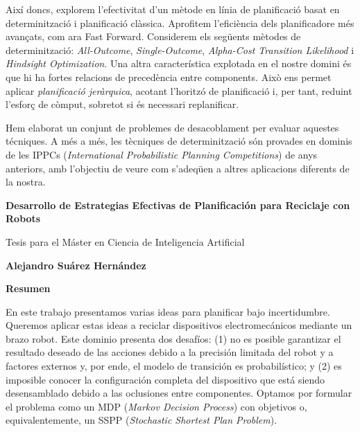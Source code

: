 Així doncs, explorem l'efectivitat d'un mètode en línia de planificació
basat en determinització i planificació clàssica. Aprofitem l'eficiència
dels planificadore més avançats, com ara Fast Forward. Considerem els
següents mètodes de determinització: \emph{All-Outcome}, \emph{Single-Outcome},
\emph{Alpha-Cost Transition Likelihood} i \emph{Hindsight Optimization}.
Una altra característica explotada en el nostre domini és que hi ha fortes
relacions de precedència entre
components. Això ens permet aplicar \emph{planificació jeràrquica}, acotant
l'horitzó de planificació i, per tant, reduint l'esforç de còmput,
sobretot si és necessari replanificar.

Hem elaborat un conjunt de problemes de desacoblament per evaluar aquestes
técniques. A més a més, les tècniques de determinització són provades en
dominis de les IPPCs (\emph{International Probabilistic Planning Competitions}) de
anys anteriors, amb l'objectiu de veure com s'adeqüen a altres aplicacions
diferents de la nostra.

\cleardoublepage

\thispagestyle{plain}
\begin{center}
	\Large
	\textbf{Desarrollo de Estrategias Efectivas de Planificación para Reciclaje con Robots}
	
	\vspace{0.4cm}
	\large
	Tesis para el Máster en Ciencia de Inteligencia Artificial
	
	\vspace{0.4cm}
	\textbf{Alejandro Suárez Hernández}
	
	\vspace{0.9cm}
	\textbf{Resumen}
\end{center}

En este trabajo presentamos varias ideas para planificar bajo
incertidumbre. Queremos aplicar estas ideas a reciclar
dispositivos electromecánicos mediante un brazo robot. Este dominio
presenta dos desafíos: (1) no es posible garantizar el resultado deseado
de las acciones debido a la precisión limitada del robot y a factores
externos y, por ende, el modelo de transición es probabilístico; y (2)
es imposible conocer la configuración completa del dispositivo que
está siendo
desensamblado debido a las oclusiones entre componentes. Optamos
por formular el problema como un MDP (\emph{Markov Decision Process})
con objetivos o, equivalentemente, un SSPP (\emph{Stochastic Shortest Plan Problem}).

